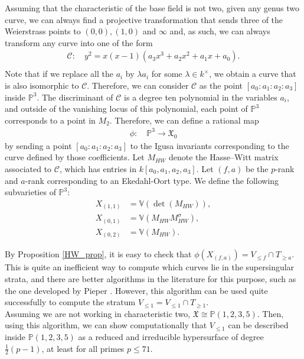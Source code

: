 \documentclass{amsart}
\newcommand{\calC}{\mathcal{C}}
\numberwithin{equation}{section}
\theoremstyle{definition}
\theoremstyle{remark}
\begin{document}
Assuming that the characteristic of the base field is not two, given any genus two curve, we can always find a projective transformation that sends three of the Weierstrass points to $(0,0),(1,0)$ and $\infty$ and, as such, we can always transform any curve into one of the form
\begin{align*}
\calC\colon\quad y^2=x(x-1)(a_3x^3+a_2 x^2+a_1x+a_0).\\
\end{align*} 
Note that if we replace all the $a_i$ by $\lambda a_i$ for some $\lambda\in k^\times$, we obtain a curve that is also isomorphic to $\calC$. Therefore, we can consider $\calC$ as the point $[a_0:a_1:a_2:a_3]$ inside $\mathbb{P}^3$. The discriminant of $\calC$ is a degree ten polynomial in the variables $a_i$, and outside of the vanishing locus of this polynomial, each point of $\mathbb{P}^3$ corresponds to a point in $M_2$. Therefore, we can define a rational map
\begin{align*}
\phi\colon\quad\mathbb{P}^3\longrightarrow\mathfrak{X}_0
\end{align*}
by sending a point $[a_0:a_1:a_2:a_3]$ to the Igusa invariants corresponding to the curve defined by those coefficients. Let $M_{HW}$ denote the Hasse–Witt matrix associated to $\calC$, which has entries in $k[a_0,a_1,a_2,a_3]$. Let $(f,a)$ be the $p$-rank and $a$-rank corresponding to an Ekedahl-Oort type. We define the following subvarieties of $\mathbb{P}^3$:
\begin{align*}
X_{(1,1)} &= \mathbb{V}(\det(M_{HW})),\\
X_{(0,1)} &= \mathbb{V}(M_{HW} M_{HW}^\sigma),\\
X_{(0,2)} &= \mathbb{V}(M_{HW}).
\end{align*}

By Proposition \ref{HW_prop},  it is easy to check that $\phi(X_{(f,a)})=V_{\leq f}\cap T_{\geq a}$.\\

This is quite an inefficient way to compute which curves lie in the supersingular strata, and there are better algorithms in the literature for this purpose, such as the one developed by Pieper \cite{Pieper2022ConstructingJacobian}. However, this algorithm can be used quite successfully to compute the stratum $V_{\leq 1}=V_{\leq 1}\cap T_{\geq 1}$.\\

Assuming we are not working in characteristic two, $\mathfrak{X}\cong\mathbb{P}(1,2,3,5)$. Then, using this algorithm, we can show computationally that $V_{\leq 1}$ can be described inside $\mathbb{P}(1,2,3,5)$ as a reduced and irreducible hypersurface of degree $\frac{1}{2}(p-1)$, at least for all primes $p\leq71$.\\
\end{document}
